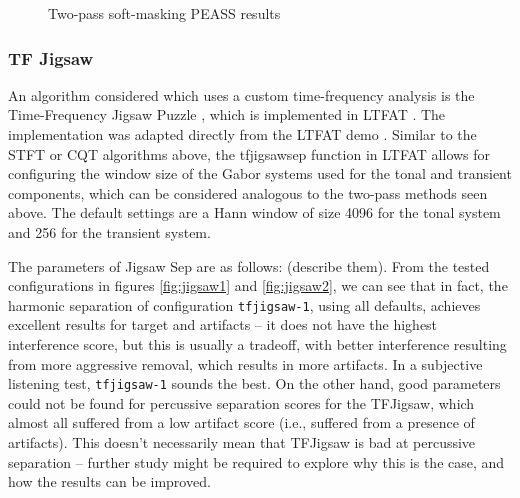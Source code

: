 \documentclass[letter,12pt]{article}
\begin{document}
\begin{figure}
	\centering
	\vspace{-1.25em}
	\caption{Two-pass soft-masking PEASS results}
	\label{fig:vocalround1soft}
\end{figure}

\subsubsection{TF Jigsaw}

An algorithm considered which uses a custom time-frequency analysis is the Time-Frequency Jigsaw Puzzle \cite{tfjigsaw}, which is implemented in LTFAT \cite{tfjigsaw2}. The implementation was adapted directly from the LTFAT demo \cite{tfjigsaw3}. Similar to the STFT or CQT algorithms above, the tfjigsawsep function in LTFAT allows for configuring the window size of the Gabor systems used for the tonal and transient components, which can be considered analogous to the two-pass methods seen above. The default settings are a Hann window of size 4096 for the tonal system and 256 for the transient system.

The parameters of Jigsaw Sep are as follows: (describe them). From the tested configurations in figures \ref{fig:jigsaw1} and \ref{fig:jigsaw2}, we can see that in fact, the harmonic separation of configuration \Verb#tfjigsaw-1#, using all defaults, achieves excellent results for target and artifacts -- it does not have the highest interference score, but this is usually a tradeoff, with better interference resulting from more aggressive removal, which results in more artifacts. In a subjective listening test, \Verb#tfjigsaw-1# sounds the best. On the other hand, good parameters could not be found for percussive separation scores for the TFJigsaw, which almost all suffered from a low artifact score (i.e., suffered from a presence of artifacts). This doesn't necessarily mean that TFJigsaw  is bad at percussive separation -- further study might be required to explore why this is the case, and how the results can be improved.
\end{document}
